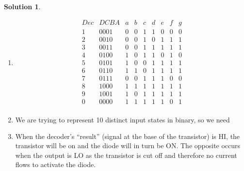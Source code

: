 \documentclass[10pt]{article}
\theoremstyle{definition}
\newtheorem{soln}{Solution}
\begin{document}
\begin{soln} ~
  \begin{enumerate}[label=(\alph*)]
    \item \begin{displaymath}
            \begin{array}{|c|c|c|c|c|c|c|c|c}
              Dec & DCBA & a & b & c & d & e & f & g \\ %
              \hline %
              1   & 0001 & 0 & 0 & 1 & 1 & 0 & 0 & 0 \\
              2   & 0010 & 0 & 0 & 1 & 0 & 1 & 1 & 1 \\
              3   & 0011 & 0 & 0 & 1 & 1 & 1 & 1 & 1 \\
              4   & 0100 & 1 & 0 & 1 & 1 & 0 & 1 & 0 \\
              5   & 0101 & 1 & 0 & 0 & 1 & 1 & 1 & 1 \\
              6   & 0110 & 1 & 1 & 0 & 1 & 1 & 1 & 1 \\
              7   & 0111 & 0 & 0 & 1 & 1 & 1 & 0 & 0 \\
              8   & 1000 & 1 & 1 & 1 & 1 & 1 & 1 & 1 \\
              9   & 1001 & 1 & 0 & 1 & 1 & 1 & 1 & 1 \\
              0   & 0000 & 1 & 1 & 1 & 1 & 1 & 0 & 1 \\
            \end{array}
          \end{displaymath}
    \item We are trying to represent 10 distinct input states in binary, so we need
    \item When the decoder's ``result'' (signal at the base of the transistor) is HI, the transistor will be on and the diode will in turn be ON. The opposite
          occurs when the output is LO as the transistor is cut off and therefore no current flows to activate the diode. 
          \begin{displaymath}
            \begin{array}{|c|c|c|c|c|c|c|c|c|c}

\end{array}
\end{displaymath}
\end{enumerate}
\end{soln}
\end{document}
